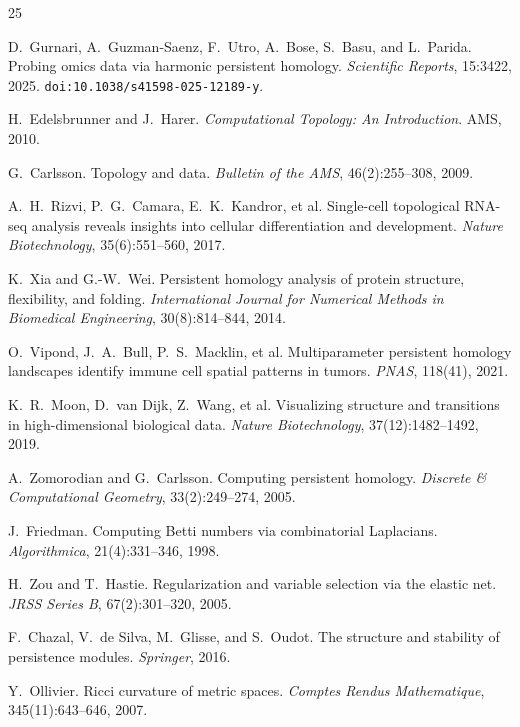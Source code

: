 \documentclass[12pt]{article}
\begin{document}

\begin{thebibliography}{25}

D.~Gurnari, A.~Guzman-Saenz, F.~Utro, A.~Bose, S.~Basu, and L.~Parida.
Probing omics data via harmonic persistent homology.
\emph{Scientific Reports}, 15:3422, 2025.
\texttt{doi:10.1038/s41598-025-12189-y}.

H.~Edelsbrunner and J.~Harer.
\emph{Computational Topology: An Introduction}.
AMS, 2010.

G.~Carlsson.
Topology and data.
\emph{Bulletin of the AMS}, 46(2):255--308, 2009.

A.~H.~Rizvi, P.~G.~Camara, E.~K.~Kandror, et al.
Single-cell topological RNA-seq analysis reveals insights into cellular differentiation and development.
\emph{Nature Biotechnology}, 35(6):551--560, 2017.

K.~Xia and G.-W.~Wei.
Persistent homology analysis of protein structure, flexibility, and folding.
\emph{International Journal for Numerical Methods in Biomedical Engineering}, 30(8):814--844, 2014.

O.~Vipond, J.~A.~Bull, P.~S.~Macklin, et al.
Multiparameter persistent homology landscapes identify immune cell spatial patterns in tumors.
\emph{PNAS}, 118(41), 2021.

K.~R.~Moon, D.~van Dijk, Z.~Wang, et al.
Visualizing structure and transitions in high-dimensional biological data.
\emph{Nature Biotechnology}, 37(12):1482--1492, 2019.

A.~Zomorodian and G.~Carlsson.
Computing persistent homology.
\emph{Discrete \& Computational Geometry}, 33(2):249--274, 2005.

J.~Friedman.
Computing Betti numbers via combinatorial Laplacians.
\emph{Algorithmica}, 21(4):331--346, 1998.

H.~Zou and T.~Hastie.
Regularization and variable selection via the elastic net.
\emph{JRSS Series B}, 67(2):301--320, 2005.

F.~Chazal, V.~de Silva, M.~Glisse, and S.~Oudot.
The structure and stability of persistence modules.
\emph{Springer}, 2016.

Y.~Ollivier.
Ricci curvature of metric spaces.
\emph{Comptes Rendus Mathematique}, 345(11):643--646, 2007.


\end{thebibliography}
\end{document}
